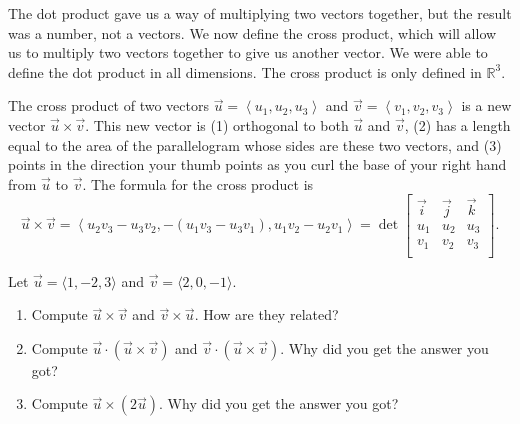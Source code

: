 \vskip0.2in

The dot product gave us a way of multiplying two vectors together, but the result was a number, not a vectors. We now define the cross product, which will allow us to multiply two vectors together to give us another vector.  We were able to define the dot product in all dimensions.  The cross product is only defined in $\mathbb{R}^3$. 

\begin{definition}
The cross product of two vectors $\vec u = \left<u_1,u_2,u_3\right>$ and $\vec v = \left<v_1,v_2,v_3\right>$ is a new vector $\vec u\times \vec v$. This new vector is (1) orthogonal to both $\vec u$ and $\vec v$, (2) has a length equal to the area of the parallelogram whose sides are these two vectors, and (3) points in the direction your thumb points as you curl the base of your right hand from $\vec u$ to $\vec v$. The formula for the cross product is $$\vec u\times \vec v = \left<u_2v_3-u_3v_2,-(u_1v_3-u_3v_1),u_1v_2-u_2v_1\right> = \det\begin{bmatrix}\vec i & \vec j&\vec k\\ u_1&u_2&u_3\\ v_1&v_2&v_3\\\end{bmatrix}.$$
\end{definition}

\begin{problem}  
%
Let $\vec u=\langle 1,-2,3\rangle $ and $\vec v=\langle 2,0,-1\rangle$.  
\begin{enumerate}
\item Compute $\vec u\times \vec v$ and $\vec v\times \vec u$.  How are they related?
\item Compute $\vec u \cdot (\vec u\times \vec v)$ and $\vec v \cdot (\vec u\times \vec v)$. Why did you get the answer you got?
\item Compute $\vec u \times (2\vec u)$.  Why did you get the answer you got?
\end{enumerate}
\end{problem}

